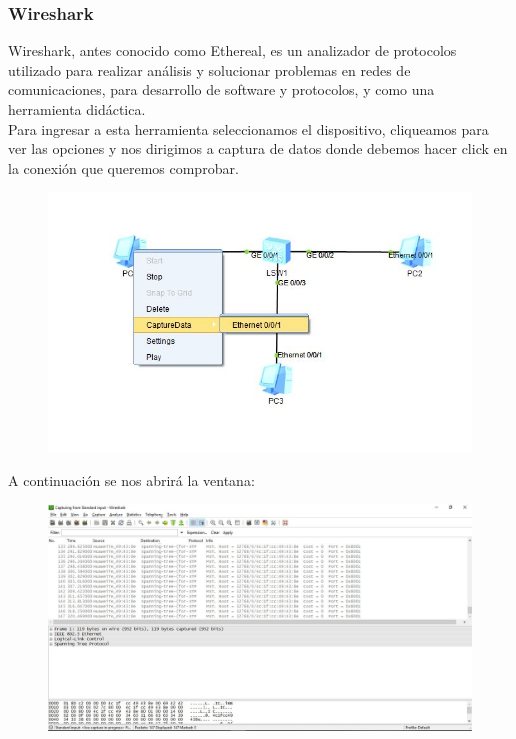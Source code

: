 \documentclass[journal]{IEEEtran}
\begin{document}
\subsubsection{Wireshark}
Wireshark, antes conocido como Ethereal, es un analizador de protocolos utilizado para realizar análisis y solucionar problemas en redes de comunicaciones, para desarrollo de software y protocolos, y como una herramienta didáctica.\\
Para ingresar a esta herramienta seleccionamos el dispositivo, cliqueamos para ver las opciones y nos dirigimos a captura de datos donde debemos hacer click en la conexión que queremos comprobar.
\begin{center}
\begin{figure}[H]
\centering
\includegraphics[scale=0.55]{11.JPG} 
\end{figure}
\end{center}
A continuación se nos abrirá la ventana: 
\begin{center}
\begin{figure}[H]
\centering
\includegraphics[scale=0.25]{13,5.JPG} 
\end{figure}
\end{center}
\end{document}
